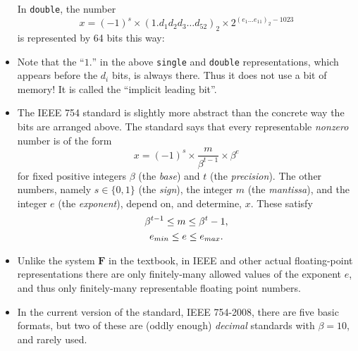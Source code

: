 \documentclass[11pt]{amsart}
\begin{document}
\begin{itemize}
\noindent In \texttt{double}, the number
       $$x = (-1)^s \times \left(1.d_1 d_2 d_3 \dots d_{52}\right)_{2} \times 2^{\left(e_1\dots e_{11}\right)_2 - 1023}$$
is represented by 64 bits this way:

\medskip

\item Note that the ``$1.$'' in the above \texttt{single} and  \texttt{double} representations, which appears before the $d_i$ bits, is always there.  Thus it does not use a bit of memory!  It is called the ``implicit leading bit''.

\item The IEEE 754 standard is slightly more abstract than the concrete way the bits are arranged above.  The standard says that every representable \emph{nonzero} number is of the form
\begin{equation}
x = (-1)^s \times \frac{m}{\beta^{t-1}} \times \beta^e  \label{ieeeform}
\end{equation}
for fixed positive integers $\beta$ (the \emph{base}) and $t$ (the \emph{precision}).  The other numbers, namely $s\in\{0,1\}$ (the \emph{sign}), the integer $m$ (the \emph{mantissa}), and the integer $e$ (the \emph{exponent}), depend on, and determine, $x$.  These satisfy
\begin{gather}
\beta^{t-1} \le m \le \beta^t - 1, \label{ieeeconstraint} \\
e_{min} \le e \le e_{max}. \notag
\end{gather}

\item Unlike the system $\mathbf{F}$ in the textbook, in IEEE and other actual floating-point representations there are only finitely-many allowed values of the exponent $e$, and thus only finitely-many representable floating point numbers.

\item In the current version of the standard, IEEE 754-2008, there are five basic formats, but two of these are (oddly enough) \emph{decimal} standards with $\beta=10$, and rarely used.


\end{itemize}
\end{document}
